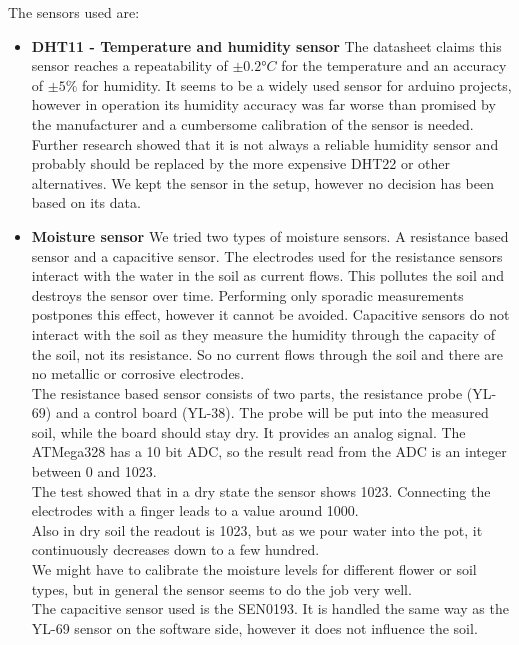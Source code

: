 The sensors used are:
\begin{itemize}

\item \textbf{DHT11 - Temperature and humidity sensor}
The datasheet claims this sensor reaches a repeatability of $\pm0.2°C$ for the temperature and an accuracy of $\pm 5\%$ for humidity. It seems to be a widely used sensor for arduino projects, however in operation its humidity accuracy was far worse than promised by the manufacturer and a cumbersome calibration of the sensor is needed. Further research showed that it is not always a reliable humidity sensor and probably should be replaced by the more expensive DHT22 or other alternatives. We kept the sensor in the setup, however no decision has been based on its data.

\item \textbf{Moisture sensor}
We tried two types of moisture sensors. A resistance based sensor and a capacitive sensor. The electrodes used for the resistance sensors interact with the water in the soil as current flows. This pollutes the soil and destroys the sensor over time. Performing only sporadic measurements postpones this effect, however it cannot be avoided. Capacitive sensors do not interact with the soil as they measure the humidity through the capacity of the soil, not its resistance. So no current flows through the soil and there are no metallic or corrosive electrodes.\\

The resistance based sensor consists of two parts, the resistance probe (YL-69) and a control board (YL-38). The probe will be put into the measured soil, while the board should stay dry. It provides an analog signal. The ATMega328 has a 10 bit ADC, so the result read from the ADC is an integer between 0 and 1023.\\

The test showed that in a dry state the sensor shows 1023. Connecting the electrodes with a finger leads to a value around 1000.\\
Also in dry soil the readout is 1023, but as we pour water into the pot, it continuously decreases down to a few hundred.\\

We might have to calibrate the moisture levels for different flower or soil types, but in general the sensor seems to do the job very well.\\

The capacitive sensor used is the SEN0193. It is handled the same way as the YL-69 sensor on the software side, however it does not influence the soil.





\end{itemize}
